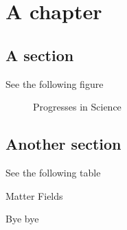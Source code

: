 \documentclass{book}
\begin{document}
\frontmatter
\listoffigures
\listoftables
\mainmatter
\chapter{A chapter}

\section{A section}

See the following figure

\begin{figure}
  \caption{Progresses in Science}
\end{figure}

\section{Another section}

See the following table

\begin{table}
  \caption{Matter Fields}
\end{table}

Bye bye
\backmatter
\end{document}
